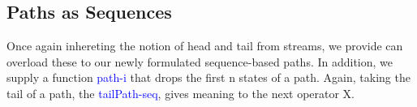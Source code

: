 \documentclass{article}
\newcommand{\blue}[1]{\textcolor{blue}{#1}}
\newcommand{\green}[1]{\textcolor{hooker\'sgreen}{#1}}
\begin{document}
\subsection{Paths as Sequences}

Once again inhereting the notion of head and tail from streams, we provide can
overload these to our newly formulated sequence-based paths. In addition, we
supply a function \blue{path-i} that drops the first n states of a path. Again,
taking the tail of a path, the \blue{tailPath-seq}, gives meaning to the next
operator \green{X}.

\begin{code}[hide]%
%
\>[2]\AgdaSpace{}%
\AgdaSymbol{:}\AgdaSpace{}%
\AgdaSpace{}%
\AgdaSpace{}%
\<%
\\
%
\>[2]\AgdaSpace{}%
\AgdaSpace{}%
\AgdaSymbol{=}\AgdaSpace{}%
\AgdaSpace{}%
\AgdaSpace{}%
\<%
\\
%
\\[\AgdaEmptyExtraSkip]%
%
\>[2]\AgdaSpace{}%
\AgdaSymbol{:}\AgdaSpace{}%
\AgdaSpace{}%
\AgdaSpace{}%
\<%
\\
%
\>[2]\AgdaSpace{}%
\AgdaSpace{}%
%
\>[34]\AgdaSpace{}%
\AgdaSymbol{=}\AgdaSpace{}%
\AgdaSpace{}%
\AgdaSpace{}%
\AgdaSymbol{(}\AgdaSpace{}%
\AgdaSymbol{)}\<%
\\
%
\>[2]\AgdaSpace{}%
\AgdaSpace{}%
%
\>[34]\AgdaSpace{}%
\AgdaSymbol{=}\AgdaSpace{}%
\AgdaSpace{}%
\AgdaSpace{}%
\AgdaSymbol{(}\AgdaSpace{}%
\AgdaSymbol{)}\<%
\\
%
\\[\AgdaEmptyExtraSkip]%
%
\>[2]\AgdaSpace{}%
\AgdaSymbol{:}\AgdaSpace{}%
\AgdaSpace{}%
\AgdaSpace{}%
\AgdaSpace{}%
\AgdaSpace{}%
\<%
\\
%
\>[2]\AgdaSpace{}%
%
\>[17]\AgdaSpace{}%
\AgdaSymbol{=}\AgdaSpace{}%
\<%
\\
%
\>[2]\AgdaSpace{}%
\AgdaSymbol{(}\AgdaSpace{}%
\AgdaSymbol{)}\AgdaSpace{}%
\AgdaSpace{}%
\AgdaSymbol{=}\AgdaSpace{}%
\AgdaSpace{}%
\AgdaSpace{}%
\AgdaSymbol{(}\AgdaSpace{}%
\AgdaSymbol{)}\<%
\end{code}
\end{document}
